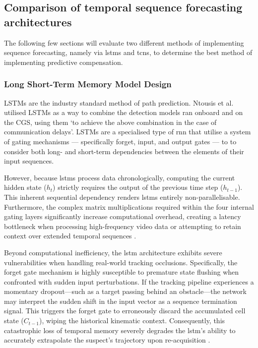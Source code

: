 \documentclass{report_template_oxford}
\begin{document}
\subsection{Comparison of temporal sequence forecasting architectures} \label{sequence_forecasting}
The following few sections will evaluate two different methods of implementing sequence forecasting, namely via \glspl{lstm} and \glspl{tcn}, to determine the best method of implementing predictive compensation. 

\subsubsection{Long Short-Term Memory Model Design}
LSTMs are the industry standard method of path prediction. Ntousis et al. \cite{ntousis} utilised LSTMs as a way to combine the detection models ran onboard and on the CGS, using them ‘to achieve the above combination in the case of communication delays’. LSTMs are a specialised type of \gls{rnn} that utilise a system of gating mechanisms — specifically forget, input, and output gates — to to consider both long- and short-term dependencies between the elements of their input sequences.

However, because \glspl{lstm} process data chronologically, computing the current hidden state (\(h_t\)) strictly requires the output of the previous time step (\(h_{t-1}\)). This inherent sequential dependency renders \glspl{lstm} entirely non-parallelisable. Furthermore, the complex matrix multiplications required within the four internal gating layers significantly increase computational overhead, creating a latency bottleneck when processing high-frequency video data or attempting to retain context over extended temporal sequences \cite{bai2018empirical}. 

Beyond computational inefficiency, the \gls{lstm} architecture exhibits severe vulnerabilities when handling real-world tracking occlusions. Specifically, the forget gate mechanism is highly susceptible to premature state flushing when confronted with sudden input perturbations. If the tracking pipeline experiences a momentary dropout—such as a target passing behind an obstacle—the network may interpret the sudden shift in the input vector as a sequence termination signal. This triggers the forget gate to erroneously discard the accumulated cell state (\(C_{t-1}\)), wiping the historical kinematic context. Consequently, this catastrophic loss of temporal memory severely degrades the \gls{lstm}'s ability to accurately extrapolate the suspect's trajectory upon re-acquisition \cite{milan2016}.
\end{document}
